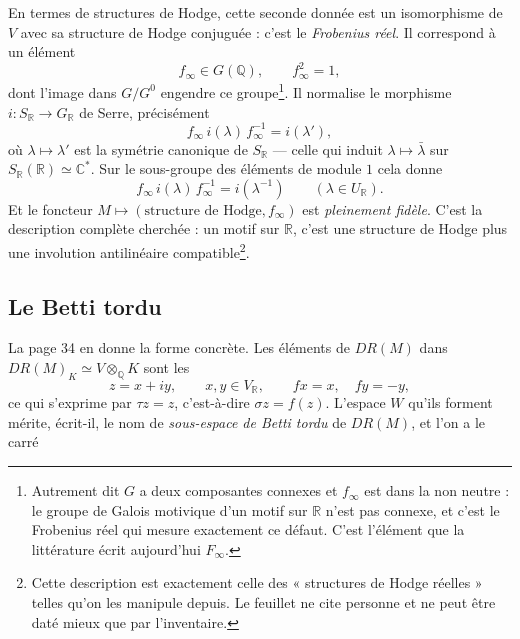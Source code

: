 \documentclass[11pt,a4paper]{article}
\begin{document}
En termes de structures de Hodge, cette seconde donnée est un isomorphisme de
$V$ avec sa structure de Hodge conjuguée : c'est le \emph{Frobenius réel}. Il
correspond à un élément
\[
  f_{\infty} \in G(\mathbb{Q}) , \qquad f_{\infty}^{2} = 1 ,
\]
dont l'image dans $G/G^{0}$ engendre ce groupe\footnote{Autrement dit $G$ a deux
composantes connexes et $f_{\infty}$ est dans la non neutre : le groupe de
Galois motivique d'un motif sur $\mathbb{R}$ n'est pas connexe, et c'est le
Frobenius réel qui mesure exactement ce défaut. C'est l'élément que la
littérature écrit aujourd'hui $F_{\infty}$.}. Il normalise le morphisme
$i \colon S_{\mathbb{R}} \to G_{\mathbb{R}}$ de Serre, précisément
\[
  f_{\infty}\, i(\lambda)\, f_{\infty}^{-1} = i(\lambda') ,
\]
où $\lambda \mapsto \lambda'$ est la symétrie canonique de $S_{\mathbb{R}}$
— celle qui induit $\lambda \mapsto \bar{\lambda}$ sur
$S_{\mathbb{R}}(\mathbb{R}) \simeq \mathbb{C}^{*}$. Sur le sous-groupe des
éléments de module $1$ cela donne
\[
  f_{\infty}\, i(\lambda)\, f_{\infty}^{-1} = i(\lambda^{-1})
  \qquad (\lambda \in U_{\mathbb{R}}) .
\]
Et le foncteur $M \mapsto (\text{structure de Hodge}, f_{\infty})$ est
\emph{pleinement fidèle}. C'est la description complète cherchée : un motif sur
$\mathbb{R}$, c'est une structure de Hodge plus une involution antilinéaire
compatible\footnote{Cette description est exactement celle des « structures de
Hodge réelles » telles qu'on les manipule depuis. Le feuillet ne cite personne
et ne peut être daté mieux que par l'inventaire.}.

\subsection*{Le Betti tordu}

La page 34 en donne la forme concrète. Les éléments de $DR(M)$ dans
$DR(M)_{K} \simeq V \otimes_{\mathbb{Q}} K$ sont les
\[
  z = x + iy , \qquad x, y \in V_{\mathbb{R}} , \qquad
  f x = x , \quad f y = -y ,
\]
ce qui s'exprime par $\tau z = z$, c'est-à-dire $\sigma z = f(z)$. L'espace $W$
qu'ils forment mérite, écrit-il, le nom de \emph{sous-espace de Betti tordu} de
$DR(M)$, et l'on a le carré

\end{document}
